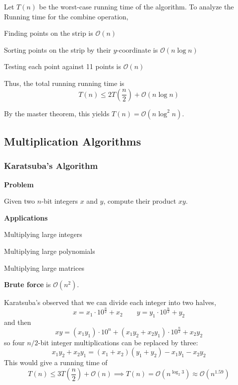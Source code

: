 Let $T(n)$ be the worst-case running time of the algorithm. To analyze the Running time for the combine operation, 
\begin{listu}
    \item Finding points on the strip is $\mathcal{O}(n)$
    \item Sorting points on the strip by their $y$-coordinate is $\mathcal{O}(n \log n)$
    \item Testing each point against 11 points is $\mathcal{O}(n)$
\end{listu}

Thus, the total running running time is \[
    T(n) \le 2T\left( \frac{n}{2} \right) + \mathcal{O}(n \log n)
\] 

By the master theorem, this yields $T(n) = \mathcal{O}(n \log^2 n)$.

\subsection{Multiplication Algorithms}

\subsubsection{Karatsuba's Algorithm}\label{subsubsec:karatsuba}

\begin{listu}
    \item \textbf{Problem}
    
    Given two $n$-bit integers $x$ and $y$, compute their product $xy$.

    \item \textbf{Applications}
    
    \begin{listu}
        \item Multiplying large integers
        \item Multiplying large polynomials
        \item Multiplying large matrices
    \end{listu}

    \item \textbf{Brute force} is $\mathcal{O}(n^2)$.
\end{listu}

Karatsuba's observed that we can divide each integer into two halves, \[
    x = x_1 \cdot 10^{\frac{n}{2}} + x_2  \qquad y = y_1 \cdot 10^{\frac{n}{2}} + y_2
\] and then \[
    xy = (x_1y_1) \cdot 10^n + (x_1y_2 + x_2y_1) \cdot 10^{\frac{n}{2}} + x_2y_2
\] so four $n/2$-bit integer multiplications can be replaced by three: \[
    x_1y_2 + x_2y_1 = (x_1 + x_2)(y_1 + y_2) - x_1y_1 - x_2y_2
\] This would give a running time of \[
    T(n) \le 3T\left( \frac{n}{2} \right) + \mathcal{O}(n) \implies T(n) = \mathcal{O}(n^{\log_2 3}) \approx \mathcal{O}(n^{1.59})
\]

